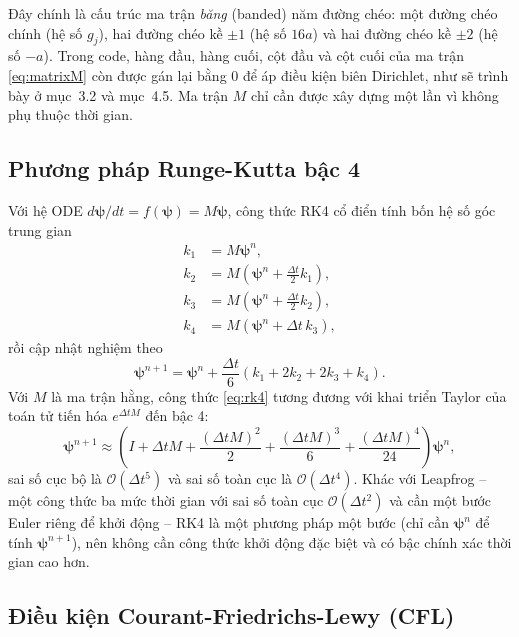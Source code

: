 \documentclass[12pt,a4paper]{article}
\begin{document}
Đây chính là cấu trúc ma trận \emph{băng} (banded) năm đường chéo: một đường chéo chính (hệ số $g_j$), hai đường chéo kề $\pm1$ (hệ số $16a$) và hai đường chéo kề $\pm2$ (hệ số $-a$). Trong code, hàng đầu, hàng cuối, cột đầu và cột cuối của ma trận \eqref{eq:matrixM} còn được gán lại bằng 0 để áp điều kiện biên Dirichlet, như sẽ trình bày ở mục~3.2 và mục~4.5. Ma trận $M$ chỉ cần được xây dựng một lần vì không phụ thuộc thời gian.

\subsection{Phương pháp Runge-Kutta bậc 4}

Với hệ ODE $d\boldsymbol\psi/dt=f(\boldsymbol\psi)=M\boldsymbol\psi$, công thức RK4 cổ điển tính bốn hệ số góc trung gian
\begin{align}
    k_1&=M\boldsymbol\psi^n,\\
    k_2&=M\left(\boldsymbol\psi^n+\frac{\Delta t}{2}k_1\right),\\
    k_3&=M\left(\boldsymbol\psi^n+\frac{\Delta t}{2}k_2\right),\\
    k_4&=M\left(\boldsymbol\psi^n+\Delta t\,k_3\right),
\end{align}
rồi cập nhật nghiệm theo
\begin{equation}
    \boxed{
    \boldsymbol\psi^{n+1}=\boldsymbol\psi^n
    +\frac{\Delta t}{6}\left(k_1+2k_2+2k_3+k_4\right).}
    \label{eq:rk4}
\end{equation}
Với $M$ là ma trận hằng, công thức \eqref{eq:rk4} tương đương với khai triển Taylor của toán tử tiến hóa $e^{\Delta t M}$ đến bậc 4:
\begin{equation}
    \boldsymbol\psi^{n+1}\approx
    \left(I+\Delta t M+\frac{(\Delta t M)^2}{2}
    +\frac{(\Delta t M)^3}{6}+\frac{(\Delta t M)^4}{24}\right)\boldsymbol\psi^n,
\end{equation}
sai số cục bộ là $\mathcal O(\Delta t^5)$ và sai số toàn cục là $\mathcal O(\Delta t^4)$. Khác với Leapfrog -- một công thức ba mức thời gian với sai số toàn cục $\mathcal O(\Delta t^2)$ và cần một bước Euler riêng để khởi động -- RK4 là một phương pháp một bước (chỉ cần $\boldsymbol\psi^n$ để tính $\boldsymbol\psi^{n+1}$), nên không cần công thức khởi động đặc biệt và có bậc chính xác thời gian cao hơn.

\subsection{Điều kiện Courant-Friedrichs-Lewy (CFL)}
\end{document}

